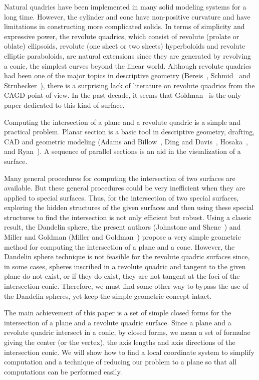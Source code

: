      Natural quadrics have been implemented in many solid modeling systems for
a long time.  However, the cylinder and cone have non-positive
curvature and have limitations in constructing more complicated solids.
In terms of simplicity and expressive power, the revolute quadrics, which 
consist of revolute (prolate or oblate) ellipsoids, revolute (one sheet or two
sheets) hyperboloids and revolute elliptic paraboloids, are natural 
extensions since they are generated by revolving a conic, the simplest curves 
beyond the linear world.  Although revolute quadrics had been one of the major
topics in descriptive geometry (Bereis~\cite{bereis:1964}, 
Schmid~\cite{schmid:1912} and Strubecker~\cite{strubecker:1958}), there is a 
surprising lack of literature on revolute quadrics from the CAGD point of view.
In the past decade, it seems that Goldman~\cite{goldman:1983a} is the only 
paper dedicated to this kind of surface.

     Computing the intersection of a plane and a revolute quadric is a simple
and practical problem.  Planar section is a basic tool in descriptive geometry,
drafting, CAD and geometric modeling (Adams and Billow~\cite{adams:1988},
Ding and Davis~\cite{ding-davis:1987}, Hosaka~\cite{hosaka:1992}, and
Ryan~\cite{ryan:1991}).  A sequence of parallel sections is an aid in the 
visualization of a surface.

     Many general procedures for computing the intersection of two surfaces are
available.  But these general procedures could be very inefficient when they
are applied to special surfaces.  Thus, for the intersection of two special
surfaces, exploring the hidden structures of the given surfaces and then using
these special structures to find the intersection is not only efficient
but robust.  Using a classic result, the Dandelin sphere, the present 
authors (Johnstone and Shene~\cite{johnstone-shene:1991}) and Miller and 
Goldman (Miller and Goldman~\cite{miller-goldman:1991a}) propose a very simple 
geometric method for computing the intersection of a plane and a cone.  
However, the Dandelin sphere technique is not feasible for the revolute 
quadric surfaces since, in some cases, spheres inscribed in a revolute quadric
and tangent to the given plane do not exist, or if they do exist, they are not
tangent at the foci of the intersection conic.  Therefore, we must find some
other way to bypass the use of the Dandelin spheres, yet keep the simple 
geometric concept intact.

     The main achievement of this paper is a set of simple closed forms for
the intersection of a plane and a revolute quadric surface.  Since a plane and 
a revolute quadric intersect in a conic, by closed forms, we mean a set of 
formulae giving the center (or the vertex), the axis lengths and axis 
directions of the intersection conic.  We will show how to find a local 
coordinate system to simplify computation and a technique of reducing our 
problem to a plane so that all computations can be performed easily.

